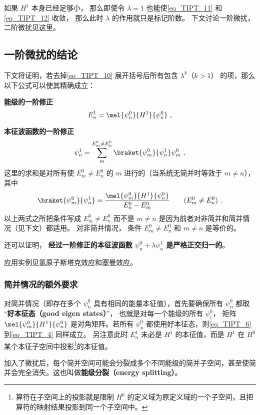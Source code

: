 如果 $H^1$ 本身已经足够小， 那么即使令 $\lambda = 1$ 也能使\autoref{eq_TIPT_11} 和\autoref{eq_TIPT_12} 收敛， 那么此时 $\lambda$ 的作用就只是标记阶数。 下文讨论一阶微扰，二阶微扰见这里。

\subsection{一阶微扰的结论}
下文将证明，若去掉\autoref{eq_TIPT_10} 展开括号后所有包含 $\lambda^k$（$k>1$） 的项，那么以下公式可以使其精确成立：

\textbf{能级的一阶修正}
\begin{equation}\label{eq_TIPT_6}
E_n^1 = \mel{\psi_n^0}{H^1}{\psi_n^0}~,
\end{equation}

\textbf{本征波函数的一阶修正}
\begin{equation}\label{eq_TIPT_5}
\psi_n^1 = \sum_m^{E_m^0 \ne E_n^0} \braket{\psi_m^0}{\psi_n^1} \psi_m^0~,
\end{equation}
这里的求和是对所有使 $E_m^0 \ne E_n^0$ 的 $m$ 进行的（当系统无简并时等效于 $m\ne n$）， 其中
\begin{equation}\label{eq_TIPT_4}
\braket{\psi_m^0}{\psi_n^1} = \frac{\mel{\psi_m^0}{H^1}{\psi_n^0}}{E_n^0 - E_m^0} \qquad (E_m^0 \ne E_n^0)~.
\end{equation}
以上两式之所把条件写成 $E_m^0 \ne E_n^0$ 而不是 $m \ne n$ 是因为前者对非简并和简并情况（见下文）都适用。 对非简并情况， 条件 $E_m^0 \ne E_n^0$ 和 $m \ne n$ 是等价的。

还可以证明， \textbf{经过一阶修正的本征波函数 $\psi_n^0 + \lambda\psi_n^1$ 是严格正交归一的}。

应用实例见氢原子斯塔克效应和塞曼效应。

\subsubsection{简并情况的额外要求}
对简并情况（即存在多个 $\psi_n^0$ 具有相同的能量本征值），首先要确保所有 $\psi_n^0$ 都取 “\textbf{好本征态（good eigen states）}”， 也就是对每一个能级的所有 $\psi_i^0$， 矩阵 $\mel{\psi_m^0}{H^1}{\psi_n^0}$ 是对角矩阵。若所有 $\psi_n^0$ 都使用好本征态，则\autoref{eq_TIPT_6} 到\autoref{eq_TIPT_4} 同样成立。 另注意此时 $E_n^1$ 未必是 $H^1$ 的本征值，而是 $H^1$ 在 $H^0$ 某个本征子空间中投影\footnote{算符在子空间上的投影就是限制 $H^0$ 的定义域为原定义域的一个子空间，且把算符的映射结果投影到同一个子空间中。}的本征值。

加入了微扰后，每个简并空间可能会分裂成多个不同能级的简并子空间，甚至使简并会完全消失。这也叫做\textbf{能级分裂（energy splitting）}。

